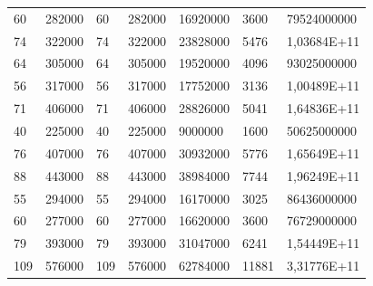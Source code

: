 \begin{enumerate}
\begin{table}
\begin{tabular}{lllllll}
60                    & 282000                 & 60                  & 282000              & 16920000                                    & 3600                    & 79524000000             \\
74                    & 322000                 & 74                  & 322000              & 23828000                                    & 5476                    & 1,03684E+11             \\
64                    & 305000                 & 64                  & 305000              & 19520000                                    & 4096                    & 93025000000             \\
56                    & 317000                 & 56                  & 317000              & 17752000                                    & 3136                    & 1,00489E+11             \\
71                    & 406000                 & 71                  & 406000              & 28826000                                    & 5041                    & 1,64836E+11             \\
40                    & 225000                 & 40                  & 225000              & 9000000                                     & 1600                    & 50625000000             \\
76                    & 407000                 & 76                  & 407000              & 30932000                                    & 5776                    & 1,65649E+11             \\
88                    & 443000                 & 88                  & 443000              & 38984000                                    & 7744                    & 1,96249E+11             \\
55                    & 294000                 & 55                  & 294000              & 16170000                                    & 3025                    & 86436000000             \\
60                    & 277000                 & 60                  & 277000              & 16620000                                    & 3600                    & 76729000000             \\
79                    & 393000                 & 79                  & 393000              & 31047000                                    & 6241                    & 1,54449E+11             \\
109                   & 576000                 & 109                 & 576000              & 62784000                                    & 11881                   & 3,31776E+11             \\

\end{tabular}
\end{table}
\end{enumerate}
